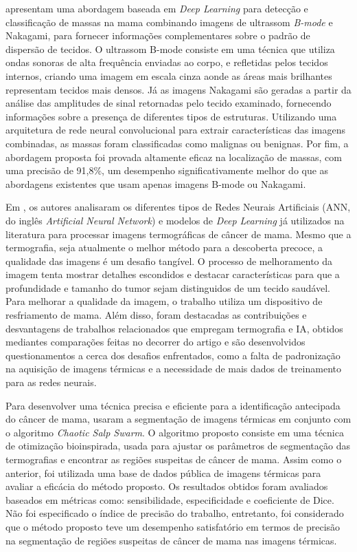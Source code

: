  apresentam uma abordagem baseada em \textit{Deep Learning} para detecção e classificação de massas na mama combinando imagens de ultrassom \textit{B-mode} e Nakagami, para fornecer informações complementares sobre o padrão de dispersão de tecidos. O ultrassom B-mode consiste em uma técnica que utiliza ondas sonoras de alta frequência enviadas ao corpo, e refletidas pelos tecidos internos, criando uma imagem em escala cinza aonde as áreas mais brilhantes representam tecidos mais densos. Já as imagens Nakagami são geradas a partir da análise das amplitudes de sinal retornadas pelo tecido examinado, fornecendo informações sobre a presença de diferentes tipos de estruturas. Utilizando uma arquitetura de rede neural convolucional para extrair características das imagens combinadas, as massas foram classificadas como malignas ou benignas. Por fim, a abordagem proposta foi provada altamente eficaz na localização de massas, com uma precisão de 91,8\%, um desempenho significativamente melhor do que as abordagens existentes que usam apenas imagens B-mode ou Nakagami.

Em , os autores analisaram os diferentes tipos de Redes Neurais Artificiais (ANN, do inglês \textit{Artificial Neural Network}) e modelos de \textit{Deep Learning} já utilizados na literatura para processar imagens termográficas de câncer de mama. Mesmo que a termografia, seja atualmente o melhor método para a descoberta precoce, a qualidade das imagens é um desafio tangível. O processo de melhoramento da imagem tenta mostrar detalhes escondidos e destacar características para que a profundidade e tamanho do tumor sejam distinguidos de um tecido saudável. Para melhorar a qualidade da imagem, o trabalho utiliza um dispositivo de resfriamento de mama. Além disso, foram destacadas as contribuições e desvantagens de trabalhos relacionados que empregam termografia e IA, obtidos mediantes comparações feitas no decorrer do artigo e são desenvolvidos questionamentos a cerca dos desafios enfrentados, como a falta de padronização na aquisição de imagens térmicas e a necessidade de mais dados de treinamento para as redes neurais. 

Para desenvolver uma técnica precisa e eficiente para a identificação antecipada do câncer de mama,  usaram a segmentação de imagens térmicas em conjunto com o algoritmo \textit{Chaotic Salp Swarm}. O algoritmo proposto consiste em uma técnica de otimização bioinspirada, usada para ajustar os parâmetros de segmentação das termografias e encontrar as regiões suspeitas de câncer de mama. Assim como o anterior, foi utilizada uma base de dados pública de imagens térmicas para avaliar a eficácia do método proposto. Os resultados obtidos foram avaliados baseados em métricas como: sensibilidade, especificidade e coeficiente de Dice. Não foi especificado o índice de precisão do trabalho, entretanto, foi considerado que o método proposto teve um desempenho satisfatório em termos de precisão na segmentação de regiões suspeitas de câncer de mama nas imagens térmicas.

